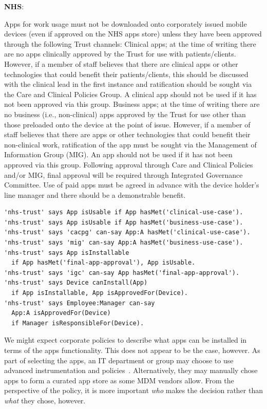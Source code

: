 \documentclass{llncs}
\newenvironment{policyrule}[1]{%
  \begin{mdframed}[]\footnotesize
      \noindent\textbf{\sffamily #1}:~\itshape%
}{%
  \end{mdframed}
}
\begin{document}
\begin{policyrule}{NHS}
  Apps for work usage must not be downloaded onto corporately issued
  mobile devices (even if approved on the NHS apps store) unless they have
  been approved through the following Trust channels:
% 
  Clinical apps; at the time of writing there are no apps clinically
  approved by the Trust for use with patients/clients. However, if a
  member of staff believes that there are clinical apps or other
  technologies that could benefit their patients/clients, this should be
  discussed with the clinical lead in the first instance and ratification
  should be sought via the Care and Clinical Policies Group. A clinical
  app should not be used if it has not been approved via this group.
% 
  Business apps; at the time of writing there are no business (i.e.,
  non-clinical) apps approved by the Trust for use other than those
  preloaded onto the device at the point of issue. However, if a member of
  staff believes that there are apps or other technologies that could
  benefit their non-clinical work, ratification of the app must be sought
  via the Management of Information Group (MIG). An app should not be used
  if it has not been approved via this group.
%
  Following approval through Care and Clinical Policies and/or MIG, final
  approval will be required through Integrated Governance Committee.
%
  Use of paid apps must be agreed in advance with the device holder's line
  manager and there should be a demonstrable benefit.
  \normalfont
  \vspace{1em} 
  \begin{lstlisting}
'nhs-trust' says App isUsable if App hasMet('clinical-use-case').
'nhs-trust' says App isUsable if App hasMet('business-use-case').
'nhs-trust' says 'cacpg' can-say App:A hasMet('clinical-use-case').
'nhs-trust' says 'mig' can-say App:A hasMet('business-use-case').
'nhs-trust' says App isInstallable
  if App hasMet('final-app-approval'), App isUsable.
'nhs-trust' says 'igc' can-say App hasMet('final-app-approval').
'nhs-trust' says Device canInstall(App)
  if App isInstallable, App isApprovedFor(Device).
'nhs-trust' says Employee:Manager can-say
  App:A isApprovedFor(Device)
  if Manager isResponsibleFor(Device).
  \end{lstlisting}
\end{policyrule}
We might expect corporate policies to describe what apps can be installed in terms of the apps functionality.
This does not appear to be the case, however. 
As part of selecting the apps, an IT department or group may choose to use advanced instrumentation and policies~\cite{armando_enabling_2014}. 
Alternatively, they may manually chose apps to form a curated app store as some \ac{MDM} vendors allow.
From the perspective of the policy, it is more important \emph{who} makes the decision rather than \emph{what} they chose, however.
\end{document}
